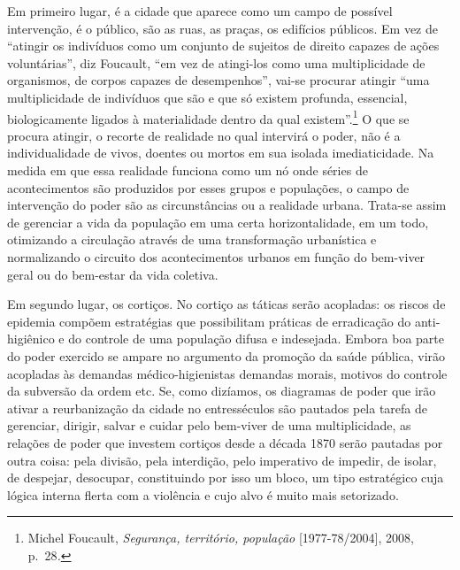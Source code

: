 Em primeiro lugar, é a cidade que aparece como um campo de possível
intervenção, é o público, são as ruas, as praças, os edifícios públicos.
Em vez de ``atingir os indivíduos como um conjunto de sujeitos de
direito capazes de ações voluntárias'', diz Foucault, ``em vez de
atingi-los como uma multiplicidade de organismos, de corpos capazes de
desempenhos'', vai-se procurar atingir ``uma multiplicidade de
indivíduos que são e que só existem profunda, essencial, biologicamente
ligados à materialidade dentro da qual existem''.\footnote{Michel
  Foucault, \emph{Segurança, território, população} {[}1977-78/2004{]},
  2008, p.~28\emph{.}} O que se procura atingir, o recorte de realidade
no qual intervirá o poder, não é a individualidade de vivos, doentes ou
mortos em sua isolada imediaticidade. Na medida em que essa realidade
funciona como um nó onde séries de acontecimentos são produzidos por
esses grupos e populações, o campo de intervenção do poder são as
circunstâncias ou a realidade urbana. Trata-se assim de gerenciar a vida
da população em uma certa horizontalidade, em um todo, otimizando a
circulação através de uma transformação urbanística e normalizando o
circuito dos acontecimentos urbanos em função do bem-viver geral ou do
bem-estar da vida coletiva.

Em segundo lugar, os cortiços. No cortiço as táticas serão acopladas: os
riscos de epidemia compõem estratégias que possibilitam práticas de
erradicação do anti-higiênico e do controle de uma população difusa e
indesejada. Embora boa parte do poder exercido se ampare no argumento da
promoção da saúde pública, virão acopladas às demandas
médico-higienistas demandas morais, motivos do controle da subversão da
ordem etc. Se, como dizíamos, os diagramas de poder que irão ativar a
reurbanização da cidade no entresséculos são pautados pela tarefa de
gerenciar, dirigir, salvar e cuidar pelo bem-viver de uma
multiplicidade, as relações de poder que investem cortiços desde a
década 1870 serão pautadas por outra coisa: pela divisão, pela
interdição, pelo imperativo de impedir, de isolar, de despejar,
desocupar, constituindo por isso um bloco, um tipo estratégico cuja
lógica interna flerta com a violência e cujo alvo é muito mais
setorizado.

